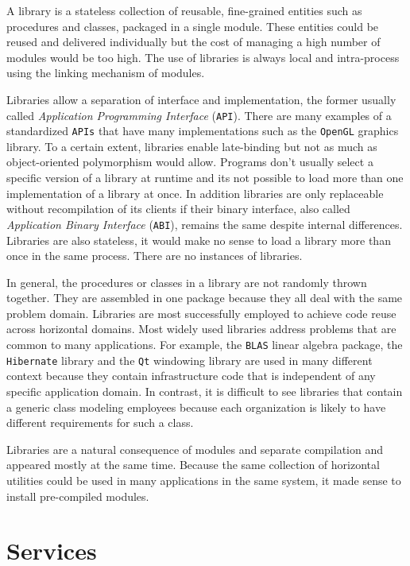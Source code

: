 A library is a stateless collection of reusable, fine-grained entities such as procedures and classes, packaged in a single module. These entities could be reused
and delivered individually but the cost of managing a high number of modules would be too high. The use of libraries is always local and intra-process using the linking
mechanism of modules.

Libraries allow a separation of interface and implementation, the former usually called \emph{Application Programming Interface} (\texttt{API}). There are many examples
of a standardized \texttt{APIs} that have many implementations such as the \texttt{OpenGL} graphics library. To a certain extent, libraries enable late-binding but not
as much as object-oriented polymorphism would allow. Programs don't usually select a specific version of a library at runtime and its not possible to load more than
one implementation of a library at once. In addition libraries are only replaceable without recompilation of its clients if their binary interface, also called
\emph{Application Binary Interface} (\texttt{ABI}), remains the same despite internal differences. Libraries are also stateless, it would make no sense to load a library
more than once in the same process. There are no instances of libraries.

In general, the procedures or classes in a library are not randomly thrown together. They are assembled in one package because they all deal with the same problem domain.
Libraries are most successfully employed to achieve code reuse across horizontal domains. Most widely used libraries address problems that are common to many applications.
For example, the \texttt{BLAS} linear algebra package, the \texttt{Hibernate} library and the \texttt{Qt} windowing library are used in many different context because they
contain infrastructure code that is independent of any specific application domain. In contrast, it is difficult to see libraries that contain a generic class modeling employees
because each organization is likely to have different requirements for such a class.

Libraries are a natural consequence of modules and separate compilation and appeared mostly at the same time. Because the same collection of horizontal utilities
could be used in many applications in the same system, it made sense to install pre-compiled modules.

\section{Services}
\label{sec:services}

